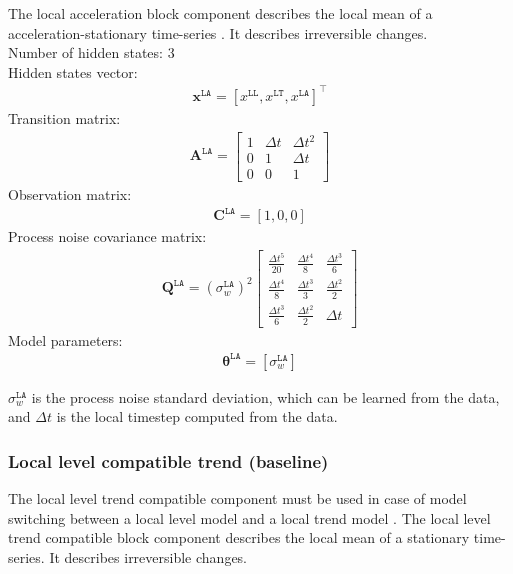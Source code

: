 The local acceleration block component describes the local mean of a acceleration-stationary time-series \cite{STC:STC2035}. 
It describes irreversible changes.\\

\noindent
Number of hidden states: 3\\

Hidden states vector: 
\begin{gather*}
\mathbf{x}^{\mathtt{LA}} = [x^{\mathtt{LL}}, x^{\mathtt{LT}} ,  x^{\mathtt{LA}}]^{\intercal}
\end{gather*}
Transition matrix: 
\begin{gather*}
\mathbf{A}^{\mathtt{LA}}=  \left[\begin{array}{ccc}1 &\Delta t&\Delta t^{2}\\0&1&\Delta t\\0&0&1\end{array}\right]
\end{gather*}
Observation matrix: 
\begin{gather*}
\mathbf{C}^{\mathtt{LA}}=[1, 0, 0]
\end{gather*}
Process noise covariance matrix: 
\begin{gather*}
\mathbf{Q}^{\mathtt{LA}}=(\sigma_{w}^{\mathtt{LA}})^{2}\left[\begin{array}{ccc}\tfrac{\Delta t^{5}}{20} &\tfrac{\Delta t^{4}}{8} &\tfrac{\Delta t^{3}}{6}\\\tfrac{\Delta t^{4}}{8} &\tfrac{\Delta t^{3}}{3}&\tfrac{\Delta t^{2}}{2}\\\tfrac{\Delta t^{3}}{6}&\tfrac{\Delta t^{2}}{2}&\Delta t\end{array}\right]
\end{gather*}
Model parameters: 
\begin{gather*}
\bm\theta^{\mathtt{LA}}=[\sigma_{w}^{\mathtt{LA}} ]
\end{gather*}

\noindent
$\sigma_{w}^{\mathtt{LA}}$ is the process noise standard deviation, which can be learned from the data, and $\Delta t$ is the local timestep computed from the data.



\subsubsection{Local level compatible trend (baseline)}

The local level trend compatible component must be used in case of model switching between a local level model and a local trend model \cite{Nguyen2018}.
The local level trend compatible block component describes the local mean of a stationary time-series. 
It describes irreversible changes.\\

